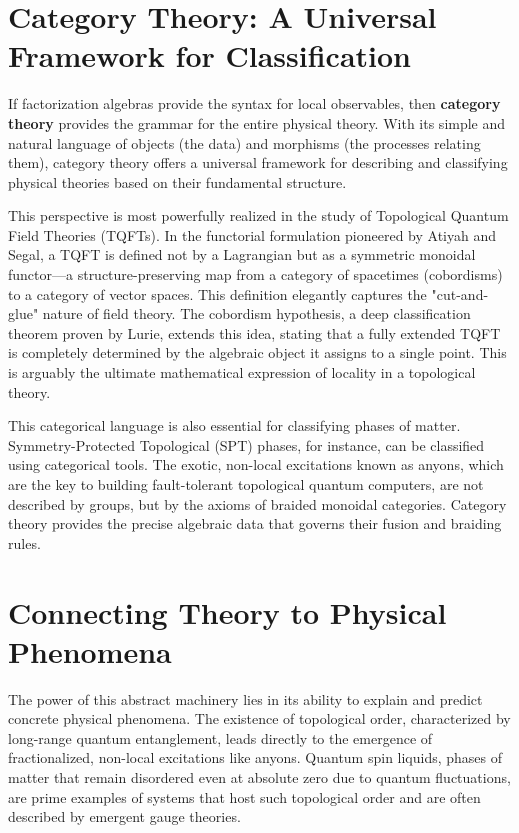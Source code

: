 \section{Category Theory: A Universal Framework for Classification}

If factorization algebras provide the syntax for local observables, then \textbf{category theory} provides the grammar for the entire physical theory.
With its simple and natural language of objects (the data) and morphisms (the processes relating them), category theory offers a universal framework for describing and classifying physical theories based on their fundamental structure.

This perspective is most powerfully realized in the study of Topological Quantum Field Theories (TQFTs).
In the functorial formulation pioneered by Atiyah and Segal, a TQFT is defined not by a Lagrangian but as a symmetric monoidal functor—a structure-preserving map from a category of spacetimes (cobordisms) to a category of vector spaces.
This definition elegantly captures the "cut-and-glue" nature of field theory.
The cobordism hypothesis, a deep classification theorem proven by Lurie, extends this idea, stating that a fully extended TQFT is completely determined by the algebraic object it assigns to a single point.
This is arguably the ultimate mathematical expression of locality in a topological theory.

This categorical language is also essential for classifying phases of matter.
Symmetry-Protected Topological (SPT) phases, for instance, can be classified using categorical tools.
The exotic, non-local excitations known as anyons, which are the key to building fault-tolerant topological quantum computers, are not described by groups, but by the axioms of braided monoidal categories.
Category theory provides the precise algebraic data that governs their fusion and braiding rules.

\section{Connecting Theory to Physical Phenomena}

The power of this abstract machinery lies in its ability to explain and predict concrete physical phenomena.
The existence of topological order, characterized by long-range quantum entanglement, leads directly to the emergence of fractionalized, non-local excitations like anyons.
Quantum spin liquids, phases of matter that remain disordered even at absolute zero due to quantum fluctuations, are prime examples of systems that host such topological order and are often described by emergent gauge theories.


